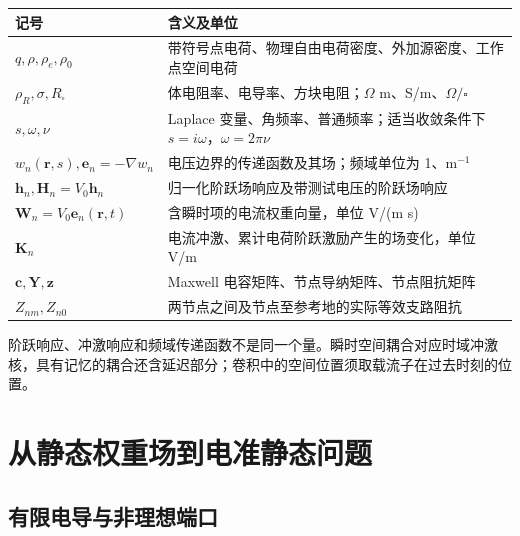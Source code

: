 \documentclass[
  11pt,
  a4paper,
  oneside,
  openany]{report}
\numberwithin{equation}{chapter}
\begin{document}
\begin{longtable}[]{@{}
  >{\raggedright\arraybackslash}p{}
  >{\raggedright\arraybackslash}p{}@{}}
\toprule\noalign{}
\begin{minipage}[b]{\linewidth}\raggedright
记号
\end{minipage} & \begin{minipage}[b]{\linewidth}\raggedright
含义及单位
\end{minipage} \\
\midrule\noalign{}
\endhead
\bottomrule\noalign{}
\endlastfoot
\(q,\rho,\rho_e,\rho_0\) &
带符号点电荷、物理自由电荷密度、外加源密度、工作点空间电荷 \\
\(\rho_R,\sigma,R_\square\) & 体电阻率、电导率、方块电阻；\(\Omega\)
m、S/m、\(\Omega/\square\) \\
\(s,\omega,\nu\) & Laplace 变量、角频率、普通频率；适当收敛条件下
\(s=i\omega\)，\(\omega=2\pi\nu\) \\
\(w_n(\mathbf r,s),\mathbf e_n=-\nabla w_n\) &
电压边界的传递函数及其场；频域单位为 1、m\(^{-1}\) \\
\(\mathbf h_n,\mathbf H_n=V_0\mathbf h_n\) &
归一化阶跃场响应及带测试电压的阶跃场响应 \\
\(\mathbf W_n=V_0\mathbf e_n(\mathbf r,t)\) &
含瞬时项的电流权重向量，单位 V/(m s) \\
\(\mathbf K_n\) & 电流冲激、累计电荷阶跃激励产生的场变化，单位 V/m \\
\(\mathbf c,\mathbf Y,\mathbf z\) & Maxwell
电容矩阵、节点导纳矩阵、节点阻抗矩阵 \\
\(Z_{nm},Z_{n0}\) & 两节点之间及节点至参考地的实际等效支路阻抗 \\
\end{longtable}

阶跃响应、冲激响应和频域传递函数不是同一个量。瞬时空间耦合对应时域冲激核，具有记忆的耦合还含延迟部分；卷积中的空间位置须取载流子在过去时刻的位置。

\clearpage
\tableofcontents
\clearpage
{}

\chapter{从静态权重场到电准静态问题}\label{chap-eqs}

\section{有限电导与非理想端口}\label{sec-assumptions}
\end{document}
